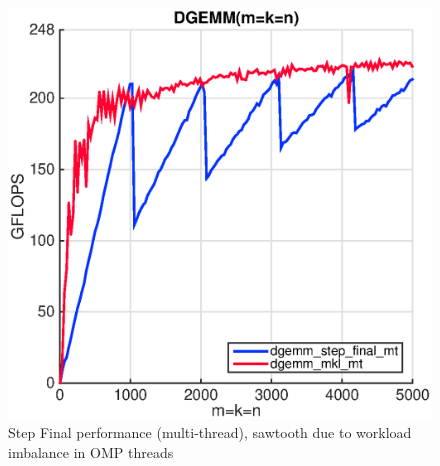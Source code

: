 \begin{figure}[!htp]
  \centering
  \includegraphics[scale=.5]{figures/step_final_multi_thread_ivy.eps}
  \caption{Step Final performance (multi-thread), sawtooth due to workload imbalance
in OMP threads}
  \label{fig:final_mt}
\end{figure} 







